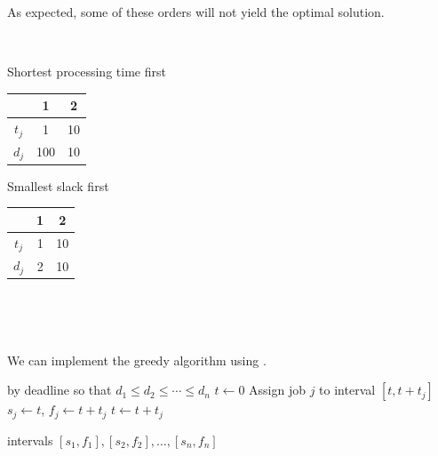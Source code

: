 As expected, some of these orders will not yield the optimal solution.

{~~~}

\begin{minipage}[t]{0.45\linewidth}
    \begin{center}
        Shortest processing time first

        \begin{tabular}{c|c|c}
                  & 1   & 2  \\ \hline
            $t_j$ & 1   & 10 \\ \hline
            $d_j$ & 100 & 10 \\
        \end{tabular}
    \end{center}
\end{minipage}
\hfil%
\begin{minipage}[t]{0.45\linewidth}
    \begin{center}
        Smallest slack first

        \begin{tabular}{c|c|c}
                  & 1 & 2  \\ \hline
            $t_j$ & 1 & 10 \\ \hline
            $d_j$ & 2 & 10 \\
        \end{tabular}
    \end{center}
\end{minipage}

{~~~}

{~~~}

We can implement the greedy algorithm using .

\begin{algorithm}
    \begin{algorithmic}
            \State {} by deadline so that $d_1 \le d_2 \le \cdots \le d_n$
            \State $t \gets 0$
                \State Assign job $j$ to interval $[t, t + t_j]$
                \State $s_j \gets t$, $f_j \gets t + t_j$
                \State $t \gets t + t_j$
            \EndFor

            \State \Return intervals $[s_1, f_1], [s_2, f_2], \dots, [s_n, f_n]$
        \EndFunction
    \end{algorithmic}
\end{algorithm}

